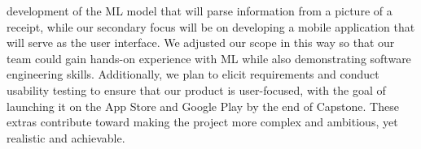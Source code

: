 \documentclass{article}
\begin{document}
\begin{enumerate}
        development of the ML model that will parse information from a picture
        of a receipt, while our secondary focus will be on developing a mobile
        application that will serve as the user interface. We adjusted our scope
        in this way so that our team could gain hands-on experience with ML
        while also demonstrating software engineering skills. Additionally, we
        plan to elicit requirements and conduct usability testing to ensure that
        our product is user-focused, with the goal of launching it on the App
        Store and Google Play by the end of Capstone. These extras contribute
        toward making the project more complex and ambitious, yet realistic and
        achievable. 

\end{enumerate}  
\end{document}
